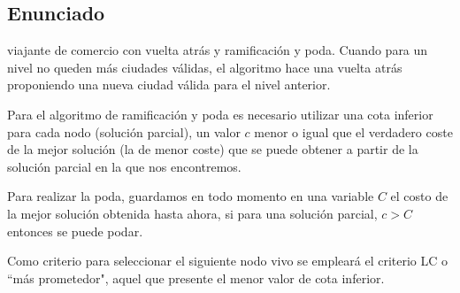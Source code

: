 \subsection{Enunciado}
\begin{frame}
	\begin{block}{viajante de comercio con vuelta atrás y ramificación y poda.}
	Cuando para un nivel no queden más ciudades válidas, el algoritmo hace una vuelta atrás 
	proponiendo una nueva ciudad válida para el nivel anterior.

	Para el algoritmo de ramificación y poda es necesario utilizar una cota inferior para cada nodo 
	(solución parcial), un valor $c$ menor o igual que el verdadero coste de la mejor solución (la de 
	menor coste) que se puede obtener a partir de la solución parcial en la que nos encontremos.

	Para realizar la poda, guardamos en todo momento en una variable $C$ el costo de la mejor solución
	obtenida hasta ahora, si para una solución parcial, $c>C$ entonces se puede podar.

	Como criterio para seleccionar el siguiente nodo vivo se empleará el criterio LC o 
	``más prometedor", aquel que presente el menor valor de cota inferior.
	\end{block}
\end{frame}